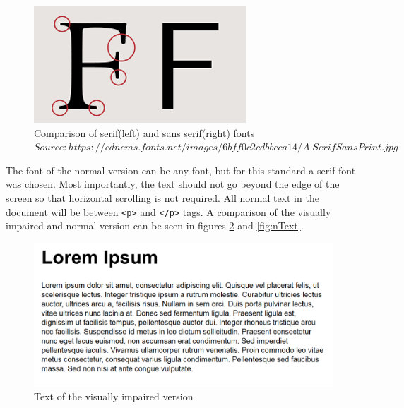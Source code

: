 \begin{figure}
	
	\begin{center}
		\includegraphics[width=\linewidth/2]{figures/sansSerif.jpg}
	\end{center}

	
	\caption{Comparison of serif(left) and sans serif(right) fonts
		\\$Source: https://cdncms.fonts.net/images/6bff0c2cdbbcca14/A.SerifSansPrint.jpg$}
	\label{fig:sansSerif}
\end{figure}

The font of the normal version can be any font, but for this standard a serif font was chosen. Most importantly, the text should not go beyond the edge of the screen so that horizontal scrolling is not required. All normal text in the document will be between \lstinline|<p>| and \lstinline|</p>| tags. A comparison of the visually impaired and normal version can be seen in figures \ref{fig:viText} and \ref{fig:nText}. 

\begin{figure}
	\includegraphics[width=\linewidth]{figures/VItext.png}	
	\caption{Text of the visually impaired version}
	\label{fig:viText}
\end{figure}

